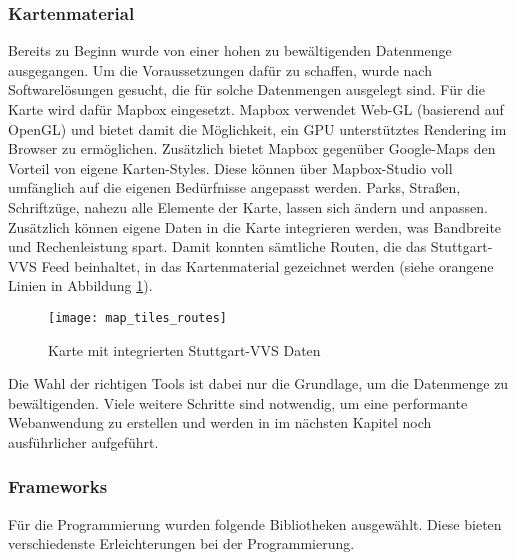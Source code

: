   \subsubsection{Kartenmaterial}
  \label{ssub:kartenmaterial}
    Bereits zu Beginn wurde von einer hohen zu bewältigenden Datenmenge ausgegangen. Um die Voraussetzungen dafür zu schaffen, wurde nach Softwarelösungen gesucht, die für solche Datenmengen ausgelegt sind. Für die Karte wird dafür Mapbox eingesetzt. Mapbox verwendet Web-GL (basierend auf OpenGL) und bietet damit die Möglichkeit, ein GPU unterstütztes Rendering im Browser zu ermöglichen. Zusätzlich bietet Mapbox gegenüber Google-Maps den Vorteil von eigene Karten-Styles. Diese können über Mapbox-Studio voll umfänglich auf die eigenen Bedürfnisse angepasst werden. Parks, Straßen, Schriftzüge, nahezu alle Elemente der Karte, lassen sich ändern und anpassen. Zusätzlich können eigene Daten in die Karte integrieren werden, was Bandbreite und Rechenleistung spart. Damit konnten sämtliche Routen, die das Stuttgart-VVS Feed beinhaltet, in das Kartenmaterial gezeichnet werden (siehe orangene Linien in Abbildung \ref{fig:map_tiles_routes}).

    \begin{figure}[htbp]
      \begin{center}
        \texttt{[image: map\_tiles\_routes]}
        \caption{Karte mit integrierten Stuttgart-VVS Daten}
        \label{fig:map_tiles_routes}
      \end{center}
    \end{figure}
    
    Die Wahl der richtigen Tools ist dabei nur die Grundlage, um die Datenmenge zu bewältigenden. Viele weitere Schritte sind notwendig, um eine performante Webanwendung zu erstellen und werden in im nächsten Kapitel  noch ausführlicher aufgeführt.
    

  \subsubsection{Frameworks}
  \label{ssub:frameworks}
    Für die Programmierung wurden folgende Bibliotheken ausgewählt. Diese bieten verschiedenste Erleichterungen bei der Programmierung.

